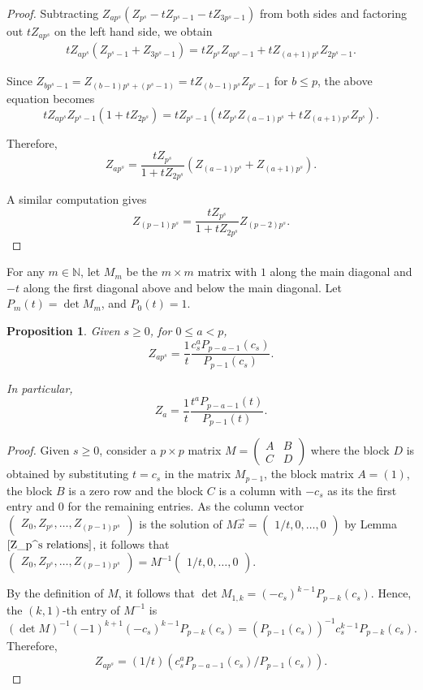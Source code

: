 \documentclass[11 pt]{amsart}
\theoremstyle{plain}
\newtheorem{prop}[thm]{Proposition}
\theoremstyle{definition}
\theoremstyle{remark}
\def\N{\mathbb{N}}
\begin{document}
\begin{proof}
Subtracting $Z_{ap^s}(Z_{p^s}-tZ_{p^s-1}-tZ_{3p^s-1})$ from both sides and factoring out $tZ_{ap^s}$ on the left hand side, we obtain \begin{align*}
    tZ_{ap^s}(Z_{p^s-1}+Z_{3p^s-1})=tZ_{p^s}Z_{ap^s-1}+tZ_{(a+1)p^s}Z_{2p^s-1}.
\end{align*}

Since $Z_{bp^s-1}=Z_{(b-1)p^s+(p^s-1)}=tZ_{(b-1)p^s}Z_{p^s-1}$ for $b\le p$, the above equation becomes $$tZ_{ap^s}Z_{p^s-1}(1+tZ_{2p^s})=tZ_{p^s-1}(tZ_{p^s}Z_{(a-1)p^s}+tZ_{(a+1)p^s}Z_{p^s}).$$

Therefore, $$Z_{ap^s}=\frac{tZ_{p^s}}{1+tZ_{2p^s}}(Z_{(a-1)p^s}+Z_{(a+1)p^s}).$$ 



A similar computation gives $$Z_{(p-1)p^s}=\frac{tZ_{p^s}}{1+tZ_{2p^s}}Z_{(p-2)p^s}.$$
\end{proof}
 



For any $m\in \N$, let $M_m$ be the $m\times m$ matrix with $1$ along the main diagonal and $-t$ along the first diagonal above and below the main diagonal. Let $P_m(t)=\det M_m$, and $P_0(t)=1.$


\begin{prop} \label{Z_ap^s}
Given $s \ge 0$, for $0 \le a <p$,
  $$Z_{ap^s}=\frac{1}{t} \frac{c_s^{a}P_{p-a-1}(c_s)}{P_{p-1}(c_s)}.$$

  In particular, $$Z_{a}=\frac{1}{t} \frac{t^{a}P_{p-a-1}(t)}{P_{p-1}(t)}.$$
\end{prop}

\begin{proof}
    Given $s\ge 0$, consider a $p\times p$ matrix $M=\begin{pmatrix}
        A &B\\
        C &D
    \end{pmatrix}$ where the block $D$ is obtained by substituting $t=c_s$ in the matrix $M_{p-1}$, the block matrix $A=(1)$, the block $B$ is a zero row and the block $C$ is a column with $-c_s$ as its the first entry and $0$ for the remaining entries. As the column vector $\begin{pmatrix}
            Z_0, Z_{p^s}, \ldots,             Z_{(p-1)p^s}
        \end{pmatrix}$ is the solution of $M \vec{x} =\begin{pmatrix}
        1/t,  0, \ldots,         0
        \end{pmatrix}$ by Lemma $\ref{Z_p^s relations}$, it follows that $\begin{pmatrix}
             Z_0, Z_{p^s}, \ldots,             Z_{(p-1)p^s}
        \end{pmatrix}=M^{-1} \begin{pmatrix}
        1/t,  0, \ldots,         0
        \end{pmatrix}.$

By the definition of $M$, it follows that $\det M_{1, k}= (-c_s)^{k-1}P_{p-k}(c_s)$. Hence, the $(k, 1)$-th entry of $M^{-1}$ is $$(\det M)^{-1} (-1)^{k+1}(-c_s)^{k-1}P_{p-k}(c_s)=(P_{p-1}(c_s))^{-1}c_s^{k-1}P_{p-k}(c_s).$$ Therefore, $$Z_{ap^s}=(1/t)(c_s^{a}P_{p-a-1}(c_s)/P_{p-1}(c_s)).$$
\end{proof}
\end{document}
